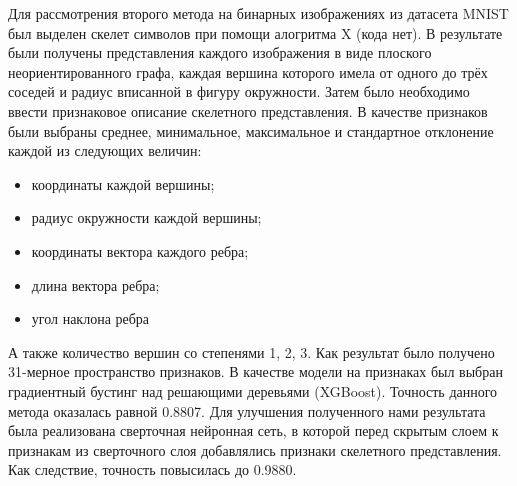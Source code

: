 ﻿\documentclass{llncs}
\begin{document}
Для рассмотрения второго метода на бинарных изображениях из датасета MNIST был выделен скелет символов при помощи алогритма X (кода нет). В результате были получены представления каждого изображения в виде плоского неориентированного графа, каждая вершина которого имела от одного до трёх соседей и радиус вписанной в фигуру окружности. Затем было необходимо ввести признаковое описание скелетного представления. В качестве признаков были выбраны среднее, минимальное, максимальное и стандартное отклонение каждой из следующих величин:
\begin{itemize}
\item координаты каждой вершины;
\item радиус окружности каждой вершины;
\item координаты вектора каждого ребра;
\item длина вектора ребра;
\item угол наклона ребра
\end{itemize}
А также количество вершин со степенями 1, 2, 3. Как результат было получено 31-мерное пространство признаков. В качестве модели на признаках был выбран градиентный бустинг над решающими деревьями (XGBoost). Точность данного метода оказалась равной 0.8807.
Для улучшения полученного нами результата была реализована сверточная нейронная сеть, в которой перед скрытым слоем к признакам из сверточного слоя добавлялись признаки скелетного представления. Как следствие, точность повысилась до 0.9880.





\end{document}
